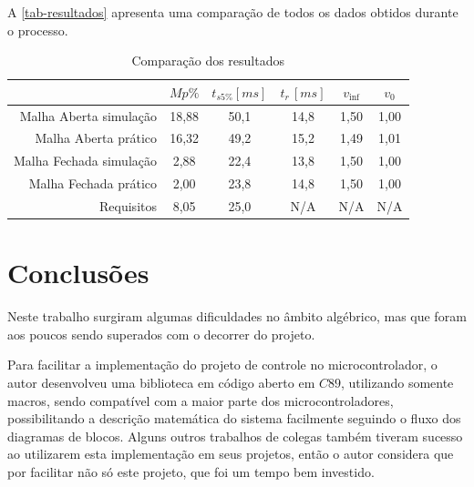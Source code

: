 \documentclass[
	12pt,				%
	article,			%
	openright,			%
	oneside,
	a4paper,			%
	chapter=TITLE,		%
	section=TITLE,		%
	english,			%
	french,				%
	spanish,			%
	brazil,				%
]{abntex2}
\begin{document}
                A \autoref{tab-resultados} apresenta uma comparação de todos os dados obtidos durante o processo.
                
                \begin{table}[htbp]
                    \label{tab-resultados}
                    \centering
                    \caption{Comparação dos resultados}
                    \begin{tabular}{r|c|c|c|c|c}
                                    &               $Mp\%$&     $t_{s5\%}[ms]$&     $t_r\,[ms]$ &       $v_{\inf}$ &	$v_{0}$ \\ \hline
                        Malha Aberta simulação  &   18,88 &     50,1 &              14,8 &              1,50 & 			1,00 \\
                        Malha Aberta prático  &     16,32 &     49,2 &              15,2 &              1,49 & 			1,01 \\
                        Malha Fechada simulação &   2,88 &      22,4 &              13,8 &              1,50 & 			1,00 \\
                        Malha Fechada prático &     2,00 &      23,8 &              14,8 &              1,50 &			1,00 \\
                        Requisitos	        &		8,05 &		25,0 &				N/A	&				N/A	&			N/A
                    \end{tabular}
                \end{table}

    \section{Conclusões}
    
        Neste trabalho surgiram algumas dificuldades no âmbito algébrico, mas que foram aos poucos sendo superados com o decorrer do projeto.
        
        Para facilitar a implementação do projeto de controle no microcontrolador, o autor desenvolveu uma biblioteca em código aberto em $C 89$, utilizando somente macros, sendo compatível com a maior parte dos microcontroladores, possibilitando a descrição matemática do sistema facilmente seguindo o fluxo dos diagramas de blocos. Alguns outros trabalhos de colegas também tiveram sucesso ao utilizarem esta implementação em seus projetos, então o autor considera que por facilitar não só este projeto, que foi um tempo bem investido.
        
\end{document}
